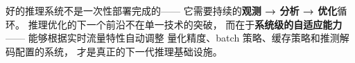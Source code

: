 好的推理系统不是一次性部署完成的——
它需要持续的\textbf{观测 → 分析 → 优化}循环。
推理优化的下一个前沿不在单一技术的突破，
而在于\textbf{系统级的自适应能力}——
能够根据实时流量特性自动调整
量化精度、batch 策略、缓存策略和推测解码配置的系统，
才是真正的下一代推理基础设施。


